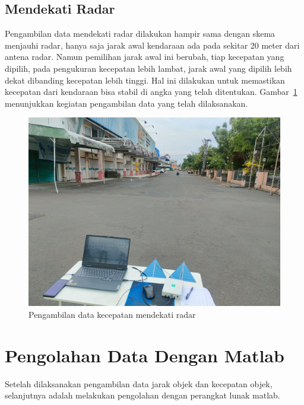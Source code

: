 \subsection{Mendekati Radar}

Pengambilan data mendekati radar dilakukan hampir sama dengan skema menjauhi radar, hanya saja jarak awal kendaraan ada pada sekitar 20 meter dari antena radar. Namun pemilihan jarak awal ini berubah, tiap kecepatan yang dipilih, pada pengukuran kecepatan lebih lambat, jarak awal yang dipilih lebih dekat dibanding kecepatan lebih tinggi. Hal ini dilakukan untuk memastikan kecepatan dari kendaraan bisa stabil di angka yang telah ditentukan. Gambar~\ref{fig:pengambilanMendekati} menunjukkan kegiatan pengambilan data yang telah dilaksanakan.

\begin{figure}
	\centering
	\includegraphics[scale=0.07]{pics/bab4/PengujianVelocity/3.jpg}
	\caption{Pengambilan data kecepatan mendekati radar}
	\label{fig:pengambilanMendekati}
\end{figure}

\section{Pengolahan Data Dengan Matlab}

Setelah dilaksanakan pengambilan data jarak objek dan kecepatan objek, selanjutnya adalah melakukan pengolahan dengan perangkat lunak matlab.

